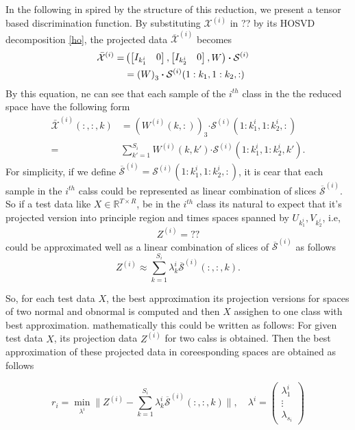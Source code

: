 \documentclass[journal]{IEEEtran}
\begin{document}
In the following  in spired by the structure of this reduction, we present a tensor based discrimination function.
By substituting $\mathcal{X}^{(i)}$ in ?? by its HOSVD decomposition \eqref{ho}, the projected data $\overline{\mathcal{X}}^{(i)}$ becomes
\begin{align}
\bar{\mathcal{X}}^{(i)}= & \notag
\left(
\begin{bmatrix}
I_{k_1^i} &  0
\end{bmatrix},
\begin{bmatrix}
I_{k_2^i} &  0
\end{bmatrix},
W
\right)\boldsymbol{\cdot} \mathcal{S}^{(i)} \notag
\\&=\left( 
W
\right)_{3} \boldsymbol{\cdot} \mathcal{S}^{(i)}(1:k_1, 1:k_2, :) \notag &
\end{align}
By this equation, ne can see that each sample of the $i^{th}$ class in the the reduced space have the following form
\begin{align*}
\bar{{\mathcal{X}}}^{(i)}(:,:,k) &= \left(  
W^{(i)}(k,:)
\right)_{3} \boldsymbol{\cdot} \mathcal{S}^{(i)}(1:k_1^i, 1:k_2^i, :)\\
=& \sum_{k' = 1}^{S_i} W^{(i)}(k,k') \boldsymbol{\cdot} \mathcal{S}^{(i)}(1:k_1^i, 1:k_2^i, k').
\end{align*}
For simplicity, if we define $\overline{\mathcal{S}}^{(i)}=\mathcal{S}^{(i)}(1:k_1^i, 1:k_2^i, :)$, it is cear that each sample in the $i^{th}$ calss could be represented as linear combination of slices $\overline{\mathcal{S}}^{(i)}$. So if a test data like $X\in \mathbb{R}^{T\times R}$, be in the $i^{th}$ class
its natural to expect that it's
projected version into principle region and times spaces  spanned by $U_{k_1^i},V_{k_2^i}$, i.e,
\[
Z^{(i)}=??
\]
could be approximated well as a linear combination of slices of $\overline{\mathcal{S}}^{(i)}$ as follows
\[
Z^{(i)} \approx \sum_{k=1}^{S_i} \lambda_k^i \overline{\mathcal{S}}^{(i)}(:,:,k).
\]

So, for each test data $X$, the best approximation its projection versions  for spaces of two normal and obnormal is computed and then $X$ assighen to one class with best approximation. mathematically this could be written as follows: For given test data $X$, its projection  data $Z^{(i)}$ for two calss is obtained. Then the best approximation of these projected data in coreesponding spaces are obtained as follows


\begin{equation}
\label{ls}
r_{i}=\min_{{\lambda^{i}}} \|Z^{(i)} -\sum_{k=1}^{S_i} \lambda_k^i \overline{\mathcal{S}}^{(i)}(:,:,k)\|,\quad
\lambda^i=\begin{pmatrix}
\lambda_1^i\\
\vdots\\
\lambda_{s_i}
\end{pmatrix}
\end{equation}
\end{document}
